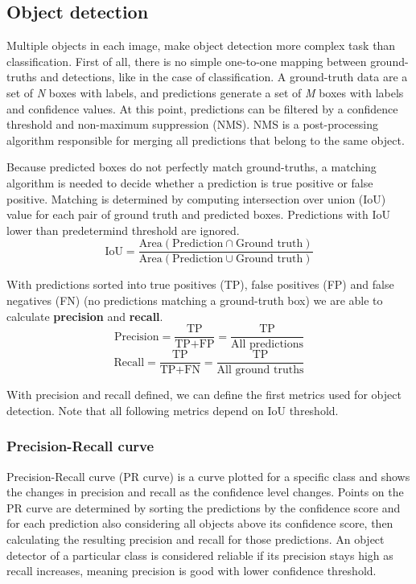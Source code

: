 \subsection*{Object detection}
Multiple objects in each image, make object detection more complex task than classification. First of all, there is no simple one-to-one mapping between ground-truths and detections, like in the case of classification. A ground-truth data are a set of \textit{N} boxes with labels, and predictions generate a set of \textit{M} boxes with labels and confidence values. At this point, predictions can be filtered by a confidence threshold and non-maximum suppression (NMS). NMS is a post-processing algorithm responsible for merging all predictions that belong to the same object. 

Because predicted boxes do not perfectly match ground-truths, a matching algorithm is needed to decide whether a prediction is true positive or false positive. Matching is determined by computing intersection over union (IoU) value for each pair of ground truth and predicted boxes. Predictions with IoU lower than predetermind threshold are ignored.
$$\text{IoU} = \frac{\text{Area}(\text{Prediction} \cap \text{Ground truth})}{\text{Area}(\text{Prediction} \cup \text{Ground truth})}$$

With predictions sorted into true positives (TP), false positives (FP) and false negatives (FN) (no predictions matching a ground-truth box) we are able to calculate \textbf{precision} and \textbf{recall}.
$$\text{Precision} = \frac{\text{TP}}{\text{TP}+\text{FP}} = \frac{\text{TP}}{\text{All predictions}}$$
$$\text{Recall} = \frac{\text{TP}}{\text{TP}+\text{FN}} = \frac{\text{TP}}{\text{All ground truths}}$$

With precision and recall defined, we can define the first metrics used for object detection. Note that all following metrics depend on IoU threshold.

\subsubsection{Precision-Recall curve}
Precision-Recall curve (PR curve) is a curve plotted for a specific class and shows the changes in precision and recall as the confidence level changes. Points on the PR curve are determined by sorting the predictions by the confidence score and for each prediction also considering all objects above its confidence score, then calculating the resulting precision and recall for those predictions. An object detector of a particular class is considered reliable if its precision stays high as recall increases, meaning precision is good with lower confidence threshold.

